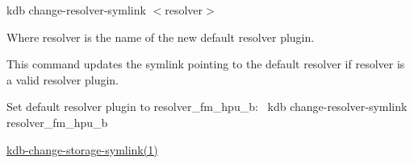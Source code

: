 {\ttfamily kdb change-\/resolver-\/symlink $<$resolver$>$}

Where {\ttfamily resolver} is the name of the new default resolver plugin.

This command updates the symlink pointing to the default resolver if {\ttfamily resolver} is a valid resolver plugin.

Set default resolver plugin to resolver\+\_\+fm\+\_\+hpu\+\_\+b\+:~\newline
 {\ttfamily kdb change-\/resolver-\/symlink resolver\+\_\+fm\+\_\+hpu\+\_\+b}


\begin{DoxyItemize}
\item \hyperlink{doc_help_kdb-change-storage-symlink_md}{kdb-\/change-\/storage-\/symlink(1)} 
\end{DoxyItemize}